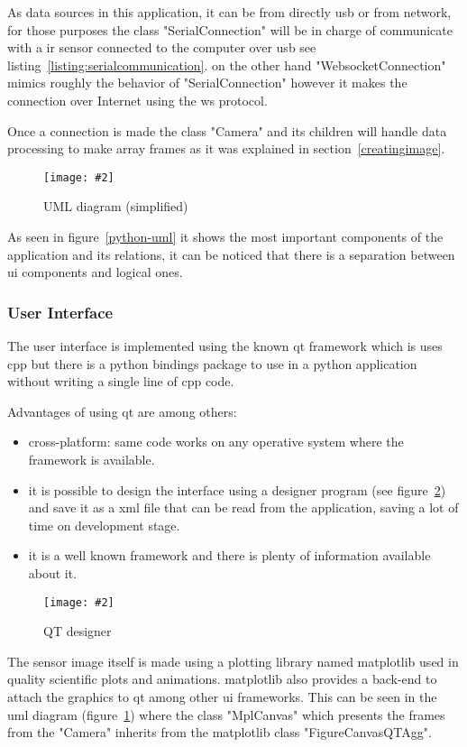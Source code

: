 \documentclass[hidelinks,11pt,a4paper,oneside,article]{memoir}
\newcommand{\putimage}[3][10] %
{
\begin{figure}[h]
	\centering
	\captionsetup{justification=centering}
	\texttt{[image: \#2]}
	\caption{#3}
	\label{fig:#2}
\end{figure}
}
\begin{document}
As data sources in this application, it can be from directly \gls{usb} or from network, for those purposes the class "SerialConnection" will be in charge of communicate with a \gls{ir} sensor connected to the computer over \gls{usb} see listing~\ref{listing:serialcommunication}. on the other hand "WebsocketConnection" mimics roughly the behavior of "SerialConnection" however it makes the connection over Internet using the \gls{ws} protocol.

Once a connection is made the class "Camera" and its children will handle data processing to make array frames as it was explained in section~\ref{creatingimage}.

    \putimage[15]{python-uml}{UML diagram (simplified)}
    
As seen in figure~\ref{python-uml} it shows the most important components of the application and its relations, it can be noticed that there is a separation between \gls{ui} components and logical ones.

\subsubsection{User Interface}
The user interface is implemented using the known \gls{qt} framework which is uses \gls{cpp} but there is a python bindings package to use in a python application without writing a single line of \gls{cpp} code. %

Advantages of using qt are among others:
\begin{itemize}
    \item cross-platform: same code works on any operative system where the framework is available.
    \item it is possible to design the interface using a designer program (see figure~\ref{fig:qt-designer}) and save it as a \gls{xml} file that can be read from the application, saving a lot of time on development stage.
    \item it is a well known framework and there is plenty of information available about it.
\end{itemize}

    \putimage{qt-designer}{QT designer}

The sensor image itself is made using a plotting library named \gls{matplotlib} used in quality scientific plots and animations. \gls{matplotlib}  also provides a back-end to attach the graphics to \gls{qt} among other \gls{ui} frameworks. This can be seen in the \gls{uml} diagram (figure~\ref{fig:python-uml}) where the class "MplCanvas" which presents the frames from the "Camera" inherits from the \gls{matplotlib} class "FigureCanvasQTAgg". %
\end{document}
